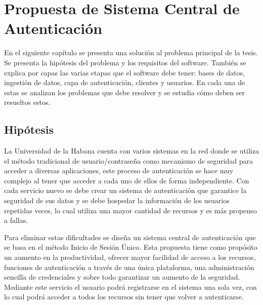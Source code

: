 \chapter{Propuesta de Sistema Central de Autenticación}\label{chapter:proposal}
En el siguiente capítulo se presenta una solución al problema principal de la tesis. Se presenta la hipótesis del problema y los requisitos del software. También se explica por capas las varias etapas que el software debe tener: bases de datos, ingestión de datos, capa de autenticación, clientes y usuarios. En cada una de estas se analizan los problemas que debe resolver y se estudia cómo deben ser resueltos estos.
\section{Hipótesis}
La Universidad de la Habana cuenta con varios sistemas en la red donde se utiliza el método tradicional de usuario/contraseña como mecanismo de seguridad para acceder a diversas aplicaciones, este proceso de autenticación se hace muy complejo al tener que acceder a cada uno de ellos de forma independiente. Con cada servicio nuevo se debe crear un sistema de autenticación que garantice la seguridad de sus datos y se debe hospedar la información de los usuarios repetidas veces, lo cual utiliza una mayor cantidad de recursos y es más propenso a fallas.

Para eliminar estas dificultades se diseña un sistema central de autenticación que se basa en el método Inicio de Sesión Único. Esta propuesta tiene como propósito un aumento en la productividad, ofrecer mayor facilidad de acceso a los recursos, funciones de autenticación a través de una única plataforma, una administración sencilla de credenciales y sobre todo garantizar un aumento de la seguridad. Mediante este servicio el usuario podrá registrarse en el sistema una sola vez, con lo cual podrá acceder a todos los recursos sin tener que volver a autenticarse.



